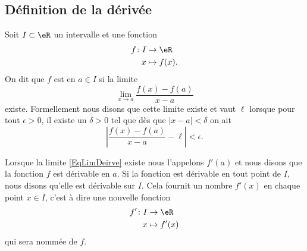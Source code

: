 \newcommand{\CaptionFigLesSubFigures}{Recherche de la tangente par approximations successives.}


\subsection{Définition de la dérivée}

Soit $I\subset\eR$ un intervalle et une fonction
\begin{equation}
	\begin{aligned}
		f\colon I&\to \eR \\
		x&\mapsto f(x). 
	\end{aligned}
\end{equation}
On dit que $f$ est  en $a\in I$ si la limite
\begin{equation}	\label{EqLimDeirve}
	\lim_{x\to a} \frac{ f(x)-f(a) }{ x-a }
\end{equation}
existe. Formellement nous disons que cette limite existe et vaut $\ell$ lorsque pour tout $\epsilon>0$, il existe un $\delta>0$ tel que dès que $| x-a |<\delta$ on ait
\begin{equation}
	\left| \frac{ f(x)-f(a) }{ x-a } -\ell \right| <\epsilon.
\end{equation}

Lorsque la limite \eqref{EqLimDeirve} existe nous l'appelons $f'(a)$ et nous disons que la fonction $f$ est dérivable en $a$. Si la fonction est dérivable en tout point de $I$, nous disons qu'elle est dérivable sur $I$. Cela fournit un nombre $f'(x)$ en chaque point $x\in I$, c'est à dire une nouvelle fonction
\begin{equation}
	\begin{aligned}
		f'\colon I&\to \eR \\
		x&\mapsto f'(x)
	\end{aligned}
\end{equation}
qui sera nommée  de $f$.

